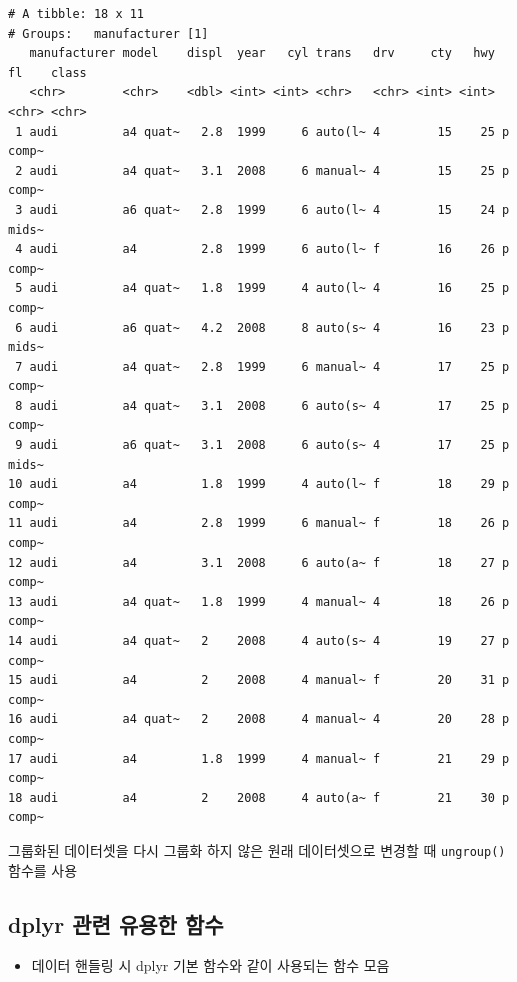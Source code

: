 \documentclass[
  11pt,
]{krantz}
\providecommand{\tightlist}{%
  \setlength{\itemsep}{0pt}\setlength{\parskip}{0pt}}
\let\BeginKnitrBlock\begin \let\EndKnitrBlock\end
\begin{document}
\begin{verbatim}
# A tibble: 18 x 11
# Groups:   manufacturer [1]
   manufacturer model    displ  year   cyl trans   drv     cty   hwy fl    class
   <chr>        <chr>    <dbl> <int> <int> <chr>   <chr> <int> <int> <chr> <chr>
 1 audi         a4 quat~   2.8  1999     6 auto(l~ 4        15    25 p     comp~
 2 audi         a4 quat~   3.1  2008     6 manual~ 4        15    25 p     comp~
 3 audi         a6 quat~   2.8  1999     6 auto(l~ 4        15    24 p     mids~
 4 audi         a4         2.8  1999     6 auto(l~ f        16    26 p     comp~
 5 audi         a4 quat~   1.8  1999     4 auto(l~ 4        16    25 p     comp~
 6 audi         a6 quat~   4.2  2008     8 auto(s~ 4        16    23 p     mids~
 7 audi         a4 quat~   2.8  1999     6 manual~ 4        17    25 p     comp~
 8 audi         a4 quat~   3.1  2008     6 auto(s~ 4        17    25 p     comp~
 9 audi         a6 quat~   3.1  2008     6 auto(s~ 4        17    25 p     mids~
10 audi         a4         1.8  1999     4 auto(l~ f        18    29 p     comp~
11 audi         a4         2.8  1999     6 manual~ f        18    26 p     comp~
12 audi         a4         3.1  2008     6 auto(a~ f        18    27 p     comp~
13 audi         a4 quat~   1.8  1999     4 manual~ 4        18    26 p     comp~
14 audi         a4 quat~   2    2008     4 auto(s~ 4        19    27 p     comp~
15 audi         a4         2    2008     4 manual~ f        20    31 p     comp~
16 audi         a4 quat~   2    2008     4 manual~ 4        20    28 p     comp~
17 audi         a4         1.8  1999     4 manual~ f        21    29 p     comp~
18 audi         a4         2    2008     4 auto(a~ f        21    30 p     comp~
\end{verbatim}

\normalsize

\footnotesize

\BeginKnitrBlock{rmdtip}
그룹화된 데이터셋을 다시 그룹화 하지 않은 원래 데이터셋으로 변경할 때 \texttt{ungroup()} 함수를 사용
\EndKnitrBlock{rmdtip}

\normalsize

\hypertarget{dplyr-application}{%
\subsection{dplyr 관련 유용한 함수}\label{dplyr-application}}

\begin{itemize}
\tightlist
\item
  데이터 핸들링 시 dplyr 기본 함수와 같이 사용되는 함수 모음
\end{itemize}
\end{document}

